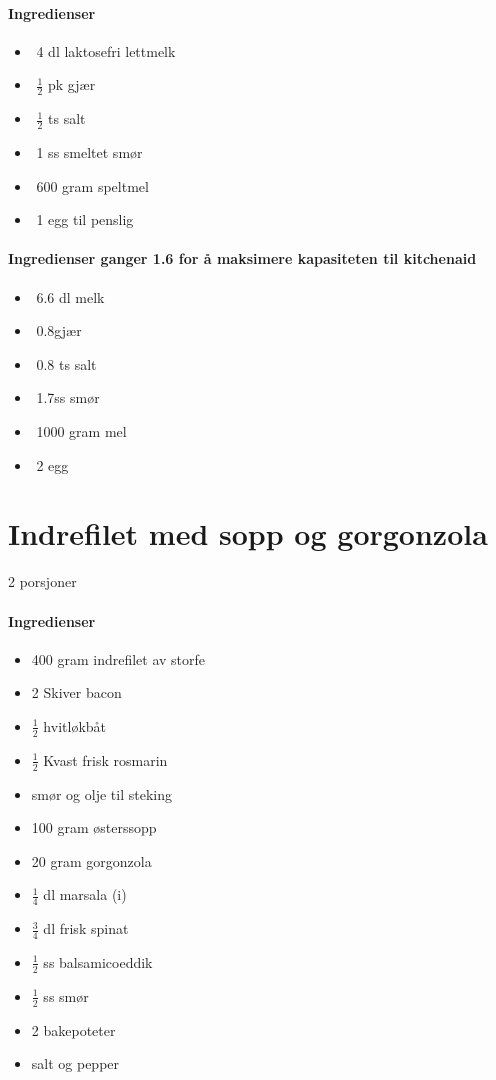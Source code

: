 \documentclass[12pt,a4paper]{book}
\begin{document}
\paragraph{Ingredienser}
\begin{itemize}[noitemsep]
	\item﻿ 4 dl laktosefri lettmelk
	\item﻿ $\frac{1}{2}$ pk gjær
	\item﻿  $\frac{1}{2}$  ts salt
	\item﻿ 1 ss smeltet smør
	\item﻿ 600 gram speltmel
	\item﻿ 1 egg til penslig
\end{itemize}

\paragraph{Ingredienser ganger 1.6 for å maksimere kapasiteten til kitchenaid}
\begin{itemize}[noitemsep]
	\item﻿ 6.6 dl melk
	\item﻿ 0.8gjær
	\item﻿ 0.8 ts salt
	\item﻿ 1.7ss smør
	\item﻿ 1000 gram mel
	\item﻿ 2 egg
\end{itemize}

\clearpage{}
\clearpage{}\section{﻿Indrefilet med sopp og gorgonzola}
2 porsjoner

\paragraph{Ingredienser}
\begin{itemize}[noitemsep]
	\item 400 gram indrefilet av storfe
	\item 2 Skiver bacon
	\item $\frac{1}{2}$  hvitløkbåt
	\item $\frac{1}{2}$  Kvast frisk rosmarin
	\item smør og olje til steking
	\item 100 gram østerssopp
	\item 20 gram gorgonzola
	\item $\frac{1}{4}$  dl marsala (i)
	\item $\frac{3}{4}$  dl frisk spinat
	\item $\frac{1}{2}$  ss balsamicoeddik
	\item $\frac{1}{2}$  ss smør
	\item 2 bakepoteter
	\item salt og pepper


\end{itemize}
\end{document}
